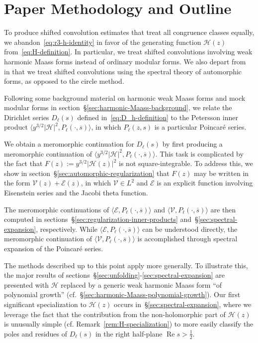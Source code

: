 \documentclass[11pt,reqno]{amsart}
\theoremstyle{plain}
\theoremstyle{definition}
\numberwithin{equation}{section}
\renewcommand{\Re}{\operatorname{Re}}
\begin{document}
\section*{Paper Methodology and Outline}

To produce shifted convolution estimates that treat all congruence classes equally, we abandon~\eqref{eq:r3-h-identity} in favor of the generating function $\mathcal{H}(z)$ from~\eqref{eq:H-definition}. In particular, we treat shifted convolutions involving weak harmonic Maass forms instead of ordinary modular forms. We also depart from~\cite{Kumaraswamy18} in that we treat shifted convolutions using the spectral theory of automorphic forms, as opposed to the circle method.

Following some background material on harmonic weak Maass forms and mock modular forms in section~\S{\ref{sec:harmonic-Maass-background}}, we relate the Dirichlet series $D_\ell(s)$ defined in~\eqref{eq:D_h-definition} to the Petersson inner product $\langle y^{3/2} \vert \mathcal{H} \vert^2, P_\ell(\cdot, \overline{s}) \rangle$, in which $P_\ell(z,s)$ is a particular Poincar\'e series.

We obtain a meromorphic continuation for $D_\ell(s)$ by first producing a meromorphic continuation of $\langle y^{3/2} \vert \mathcal{H} \vert^2, P_\ell(\cdot, \overline{s}) \rangle$. This task is complicated by the fact that $F(z):=y^{3/2} \vert \mathcal{H}(z) \vert^2$ is not square-integrable. To address this, we show in section~\S{\ref{sec:automorphic-regularization}} that $F(z)$ may be written in the form $\mathcal{V}(z) + \mathcal{E}(z)$, in which $\mathcal{V} \in L^2$ and $\mathcal{E}$ is an explicit function involving Eisenstein series and the Jacobi theta function.

The meromorphic continuations of $\langle \mathcal{E}, P_\ell(\cdot,\overline{s}) \rangle$ and $\langle \mathcal{V}, P_\ell(\cdot,\overline{s}) \rangle$  are then computed in sections~\S{\ref{sec:regularization-inner-products}} and~\S{\ref{sec:spectral-expansion}}, respectively. While $\langle \mathcal{E}, P_\ell(\cdot,\overline{s}) \rangle$ can be understood directly, the meromorphic continuation of $\langle \mathcal{V}, P_\ell(\cdot,\overline{s}) \rangle$ is accomplished through spectral expansion of the Poincar\'e series.

The methods described up to this point apply more generally. To illustrate this, the major results of sections~\S{\ref{sec:unfolding}-\ref{sec:spectral-expansion}} are presented with $\mathcal{H}$ replaced by a generic weak harmonic Maass form ``of polynomial growth'' (cf.~\S{\ref{sec:harmonic-Maass-polynomial-growth}}). Our first significant specialization to $\mathcal{H}(z)$ occurs in~\S{\ref{sec:spectral-expansion}}, where we leverage the fact that the contribution from the non-holomorphic part of $\mathcal{H}(z)$ is unusually simple (cf. Remark~\ref{rem:H-specialization}) to more easily classify the poles and residues of $D_\ell(s)$ in the right half-plane $\Re s > \frac{1}{2}$.
\end{document}
